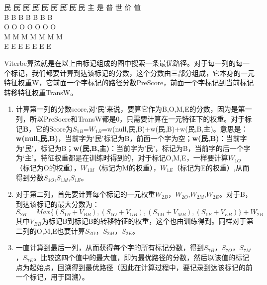 {\color{red}
\begin{tabbing}
民\hspace*{20bp} \=民\hspace*{20bp} \=民\hspace*{20bp} \=民\hspace*{20bp} \=民\hspace*{20bp} \=民\hspace*{20bp} \=民\hspace*{20bp} \=民\kill
民 \>主 \>是 \>普 \>世 \>价 \>值\\
B \>B \>B \>B \>B \>B \>B\\
O  \>O   \>O   \>O   \>O   \>O   \>O\\
M  \>M   \>M   \>M   \>M   \>M   \>M\\
E   \>E   \>E   \>E   \>E   \>E   \>E\\
\end{tabbing}}
\par Viterbe算法就是在以上由标记组成的图中搜索一条最优路径。对于每一列的每一个标记，我们都要计算到达该标记的分数，这个分数由三部分组成，它本身的一元特征权重W，它前面一个字标记的路径分数PreScore，前面一个字标记到当前标记转移特征权重TransW。
\begin{enumerate}[(1)]
\item 计算第一列的分数score,对‘民’来说，要算它作为B,O,M,E的分数，因为是第一列，所以PreSocre和TransW都是0，只需要计算在一元特征下的权重。对于标记\textbf{B}，它的Score为$S_{1B}$=$W_{1B}$=w(null,民,B)+w(民,B)+w(民,B,主)。意思是：\textbf{w(null,民,B)}，当前字为‘民’标记为B，前面一个字为空；\textbf{w(民,B)}：当前字为‘民’，标记为B；\textbf{w(民,B,主)}：当前字为’民’，标记为B，当前字的后一个字为‘主’。特征权重都是在训练时得到的，对于标记O,M,E，一样要计算$W_{1O}$（标记为O的权重），$W_{1M}$（标记为M的权重），$W_{1E}$（标记为E的权重）,从而得到分数$S_{1O}$,$S_{1M}$,$S_{1E}$。
\item 对于第二列，首先要计算每个标记的一元权重$W_{2B}$，$W_{2O}$,$W_{2M}$,$W_{2E}$。对于B，到达该标记的最大分数为：$$S_{2B}=Max\{(S_{1B}+V_{BB}),(S_{1O}+V_{OB}),(S_{1M}+V_{MB}),(S_{1E}+V_{EB})\}+W_{2B}$$
其中$V_{BB}$为标记B到标记B的转移特征的权重，这个也由训练得到。同样对于第二列的O,M,E也要计算$S_{2O}$，$S_{2M}$，$S_{2E}$。
\item 一直计算到最后一列，从而获得每个字的所有标记分数，得到$S_{7B}$，$S_{7O}$，$S_{7M}$，$S_{7E}$。比较这四个值中的最大值，即为最优路径的分数，然后以该值的标记点为起始点，回溯得到最优路径（因此在计算过程中，要记录到达该标记的前一个标记，用于回溯）。
\end{enumerate}

